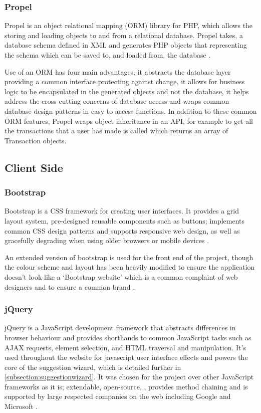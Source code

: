 \subsubsection{Propel}
Propel is an object relational mapping (ORM) library for PHP, which allows the storing and loading objects to and from a relational database.
%
Propel takes, a database schema defined in XML and generates PHP objects that representing the schema which can be saved to, and loaded from, the database \parencite{propel2014orm}.

Use of an ORM has four main advantages, it abstracts the database layer providing a common interface protecting against change, it allows for business logic to be  encapsulated in the generated objects and not the database, it helps address the cross cutting concerns of database access and wraps common database design patterns in easy to access functions. In addition to these common ORM features, Propel wraps object inheritance in an API, for example to get all the transactions that a user has made  is called which returns an array of Transaction objects.

\subsection{Client Side}
\subsubsection{Bootstrap}
Bootstrap is a CSS framework for creating user interfaces. It provides a grid layout system, pre-designed reusable components such as buttons; implements common CSS design patterns and supports responsive web design, as well as gracefully degrading when using older browsers or mobile devices \parencite{bootstrap2014bootstrap}.

An extended version of bootstrap is used for the front end of the project, though the colour scheme and layout has been heavily modified to ensure the application doesn't look like a `Bootstrap website' which is a common complaint of web designers and to ensure a common brand \parencite{kizler2013bootstrap, carrico2013bootstrap}.

\subsubsection{jQuery}
jQuery is a JavaScript development framework that abstracts differences in browser behaviour and provides shorthands to common JavaScript tasks such as AJAX requests, element selection, and HTML traversal and manipulation.
%
It's used throughout the website for javascript user interface effects and powers the core of the  suggestion wizard, which is detailed further in \autoref{subsection:suggestionwizard}.
%
It was chosen for the project over other JavaScript frameworks as it is; extendable, open-source, , provides method chaining and is supported by large respected companies on the web including Google and Microsoft \parencite{jquery2014jquery}.

